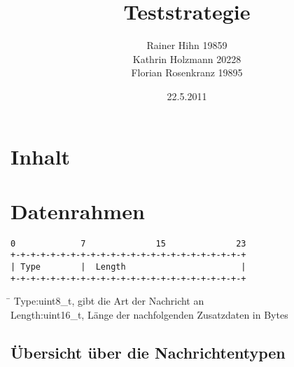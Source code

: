 \documentclass[a4paper,10pt]{article}
\title{Teststrategie}
\author{Rainer Hihn 19859\\Kathrin Holzmann 20228\\Florian Rosenkranz 19895}
\date{22.5.2011}
\begin{document}
\maketitle
\newpage


\section*{Inhalt}

\tableofcontents

\newpage

\section{Datenrahmen}

\begin{Verbatim}[fontfamily=courier]
0             7              15              23
+-+-+-+-+-+-+-+-+-+-+-+-+-+-+-+-+-+-+-+-+-+-+-+
| Type        |  Length                       |
+-+-+-+-+-+-+-+-+-+-+-+-+-+-+-+-+-+-+-+-+-+-+-+
\end{Verbatim}

\begin{tabbing}
 \hspace{2 cm}\=\kill
Type:\>uint8\_t, gibt die Art der Nachricht an\\
Length:\>uint16\_t, Länge der nachfolgenden Zusatzdaten in Bytes
\end{tabbing}

\subsection{Übersicht über die Nachrichtentypen}
\end{document}
